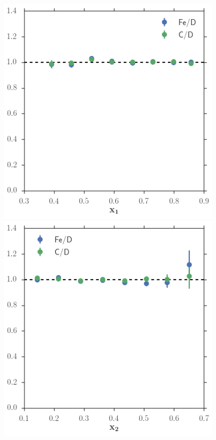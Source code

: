 \begin{figure}
	\centering
	\includegraphics[height=0.3\textheight]{figures/analysis/x1-acceptance.png}\hfill
	\includegraphics[height=0.3\textheight]{figures/analysis/x2-acceptance.png} \\

\end{figure}
